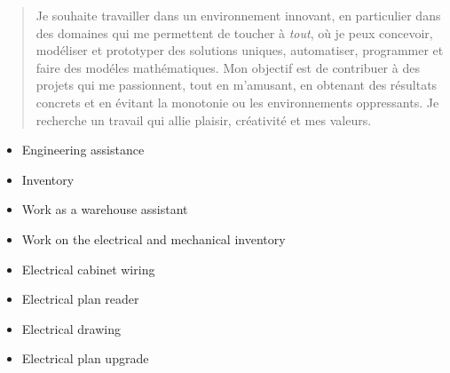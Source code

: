 \documentclass[10pt,a4paper,ragged2e,withhyper]{altacv}
\begin{document}
\begin{paracol}{2}

\begin{quote}
\footnotesize Je souhaite travailler dans un environnement innovant, en particulier dans des domaines qui me permettent de toucher à \emph{tout}, où je peux concevoir, modéliser et prototyper des solutions uniques, automatiser, programmer et faire des modéles mathématiques. Mon objectif est de contribuer à des projets qui me passionnent, tout en m'amusant, en obtenant des résultats concrets et en évitant la monotonie ou les environnements oppressants. Je recherche un travail qui allie plaisir, créativité et mes valeurs.
\end{quote}


\begin{itemize}
\item \footnotesize Engineering assistance
\item \footnotesize Inventory
\end{itemize}

\divider

\begin{itemize}
\item \footnotesize Work as a warehouse assistant
\item \footnotesize Work on the electrical and mechanical inventory
\end{itemize}

\divider

\begin{itemize}
\item \footnotesize Electrical cabinet wiring
\item \footnotesize Electrical plan reader
\end{itemize}

\divider

\begin{itemize}
\item \footnotesize Electrical drawing 
\item \footnotesize Electrical plan upgrade
\end{itemize}


\end{paracol}
\end{document}
